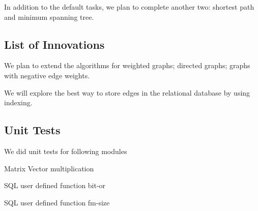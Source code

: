 In addition to the default tasks,  we plan to complete another two:  shortest path and minimum spanning tree.

\subsection{List of Innovations}
\bit
\item We plan to extend the algorithms for weighted graphs; directed graphs; graphs with negative edge weights.
\item We will explore the best way to store edges in the relational database by using indexing.
\eit

\subsection{Unit Tests}
We did unit tests for following modules
\bit
\item Matrix Vector multiplication
\item SQL user defined function bit-or
\item SQL user defined function fm-size
\eit






